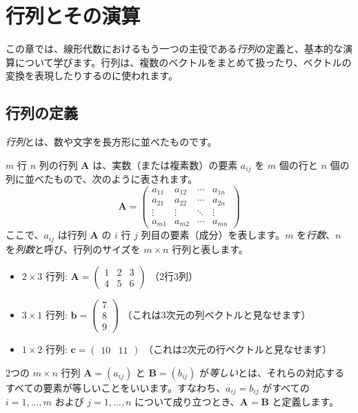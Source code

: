 \section{行列とその演算}

この章では、線形代数におけるもう一つの主役である\emph{行列}の定義と、基本的な演算について学びます。行列は、複数のベクトルをまとめて扱ったり、ベクトルの変換を表現したりするのに使われます。

\subsection{行列の定義}

\emph{行列}とは、数や文字を長方形に並べたものです。

\begin{dfn}[行列]
$m$ 行 $n$ 列の行列 $\bm{A}$ は、実数（または複素数）の要素 $a_{ij}$ を $m$ 個の行と $n$ 個の列に並べたもので、次のように表されます。
\[
\bm{A} = \begin{pmatrix}
a_{11} & a_{12} & \cdots & a_{1n} \\
a_{21} & a_{22} & \cdots & a_{2n} \\
\vdots & \vdots & \ddots & \vdots \\
a_{m1} & a_{m2} & \cdots & a_{mn}
\end{pmatrix}
\]
ここで、$a_{ij}$ は行列 $\bm{A}$ の $i$ 行 $j$ 列目の要素（成分）を表します。$m$ を\emph{行数}、$n$ を\emph{列数}と呼び、行列のサイズを $m \times n$ 行列と表します。
\end{dfn}
\begin{ex}
\begin{itemize}
\item $2 \times 3$ 行列: $\bm{A} = \begin{pmatrix} 1 & 2 & 3 \\ 4 & 5 & 6 \end{pmatrix}$ （2行3列）
\item $3 \times 1$ 行列: $\bm{b} = \begin{pmatrix} 7 \\ 8 \\ 9 \end{pmatrix}$ （これは3次元の列ベクトルと見なせます）
\item $1 \times 2$ 行列: $\bm{c} = \begin{pmatrix} 10 & 11 \end{pmatrix}$ （これは2次元の行ベクトルと見なせます）
\end{itemize}
\end{ex}
\begin{dfn}[行列の等しさ]
2つの $m \times n$ 行列 $\bm{A} = (a_{ij})$ と $\bm{B} = (b_{ij})$ が\emph{等しい}とは、それらの対応するすべての要素が等しいことをいいます。すなわち、$a_{ij} = b_{ij}$ がすべての $i=1, \ldots, m$ および $j=1, \ldots, n$ について成り立つとき、$\bm{A} = \bm{B}$ と定義します。
\end{dfn}
